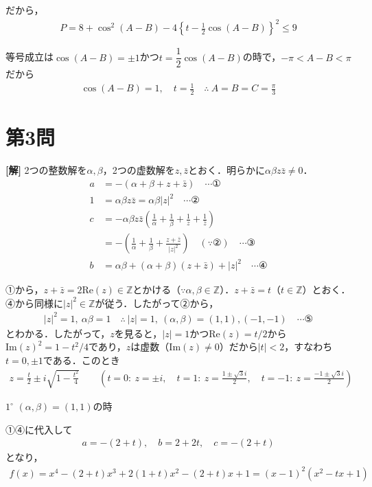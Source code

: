 \documentclass[../main.tex]{subfiles}
\begin{document}
だから，
\begin{align*}
  P=8+\cos^2(A-B)-4\left\{t-\frac12\cos(A-B)\right\}^2\le9
\end{align*}

等号成立は$\cos(A-B)=\pm1$かつ$t=\dfrac12\cos(A-B)$の時で，$-\pi<A-B<\pi$だから
\begin{align*}
  \cos(A-B)=1,\quad t=\frac12\quad\therefore\ A=B=C=\frac\pi3
\end{align*}

\newpage

\section*{第3問}

{\bf [解]}
2つの整数解を$\alpha,\beta$，2つの虚数解を$z,\bar z$とおく．明らかに$\alpha\beta z\bar z\ne0$．
\begin{align*}
  a&=-(\alpha+\beta+z+\bar z)\quad\cdots①\\
  1&=\alpha\beta z\bar z=\alpha\beta|z|^2\quad\cdots②\\
  c&=-\alpha\beta z\bar z\left(\frac1\alpha+\frac1\beta+\frac1z+\frac1{\bar z}\right)\\
  &=-\left(\frac1\alpha+\frac1\beta+\frac{z+\bar z}{|z|^2}\right)\quad(\because②)\quad\cdots③\\
  b&=\alpha\beta+(\alpha+\beta)(z+\bar z)+|z|^2\quad\cdots④
\end{align*}

①から，$z+\bar z=2\mathrm{Re}(z)\in\mathbb Z$とかける（$\because\alpha,\beta\in\mathbb Z$）．$z+\bar z=t$（$t\in\mathbb Z$）とおく．④から同様に$|z|^2\in\mathbb Z$が従う．したがって②から，
\begin{align*}
  |z|^2=1,\ \alpha\beta=1\quad\therefore\ |z|=1,\ (\alpha,\beta)=(1,1),(-1,-1)\quad\cdots⑤
\end{align*}
とわかる．したがって，$z$を見ると，$|z|=1$かつ$\mathrm{Re}(z)=t/2$から$\mathrm{Im}(z)^2=1-t^2/4$であり，$z$は虚数（$\mathrm{Im}(z)\ne0$）だから$|t|<2$，すなわち$t=0,\pm1$である．このとき
\begin{align*}
  z=\frac t2\pm i\sqrt{1-\frac{t^2}4}\qquad(t=0:\ z=\pm i,\quad t=1:\ z=\frac{1\pm\sqrt3i}2,\quad t=-1:\ z=\frac{-1\pm\sqrt3i}2)
\end{align*}

\bigskip
$1^\circ$ $(\alpha,\beta)=(1,1)$の時

①④に代入して
\begin{align*}
  a=-(2+t),\quad b=2+2t,\quad c=-(2+t)
\end{align*}
となり，
\begin{align*}
  f(x)=x^4-(2+t)x^3+2(1+t)x^2-(2+t)x+1=(x-1)^2(x^2-tx+1)
\end{align*}
\end{document}
